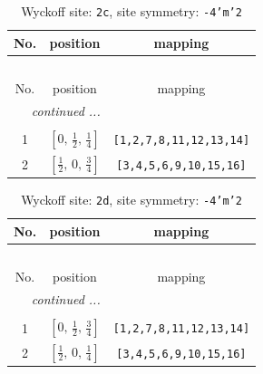 \documentclass[fleqn,8pt]{jsarticle}
\begin{document}
\renewcommand{\arraystretch}{1.2}
\begin{longtable}{ccc}
\caption{Wyckoff site: {\tt 2c}, site symmetry: {\tt -4'm'2}}
 \\
 \hline \hline
No. & position & mapping \\ \hline \endfirsthead

\multicolumn{2}{l}{\tablename\ \thetable{}} \\
 \hline \hline
No. & position & mapping \\ \hline \endhead

 \hline \hline
\multicolumn{2}{r}{\footnotesize\it continued ...} \\ \endfoot

 \hline \hline
\multicolumn{2}{r}{} \\ \endlastfoot

1 & $\left[ 0,\, \frac{1}{2},\, \frac{1}{4} \right]$ & {\tt [1,2,7,8,11,12,13,14]} \\ \hline
2 & $\left[ \frac{1}{2},\, 0,\, \frac{3}{4} \right]$ & {\tt [3,4,5,6,9,10,15,16]} \\
\end{longtable}
\renewcommand{\arraystretch}{1.2}
\begin{longtable}{ccc}
\caption{Wyckoff site: {\tt 2d}, site symmetry: {\tt -4'm'2}}
 \\
 \hline \hline
No. & position & mapping \\ \hline \endfirsthead

\multicolumn{2}{l}{\tablename\ \thetable{}} \\
 \hline \hline
No. & position & mapping \\ \hline \endhead

 \hline \hline
\multicolumn{2}{r}{\footnotesize\it continued ...} \\ \endfoot

 \hline \hline
\multicolumn{2}{r}{} \\ \endlastfoot

1 & $\left[ 0,\, \frac{1}{2},\, \frac{3}{4} \right]$ & {\tt [1,2,7,8,11,12,13,14]} \\ \hline
2 & $\left[ \frac{1}{2},\, 0,\, \frac{1}{4} \right]$ & {\tt [3,4,5,6,9,10,15,16]} \\
\end{longtable}
\renewcommand{\arraystretch}{1.2}
\end{document}
